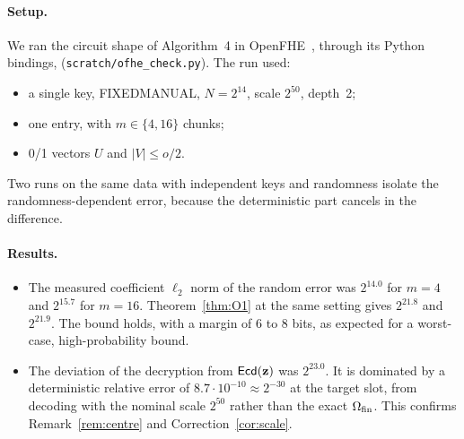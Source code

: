 \paragraph{Setup.} We ran the circuit shape of Algorithm~4 in OpenFHE~\cite{OpenFHE22}, through its Python bindings, (\texttt{scratch/ofhe\_check.py}). The run used:
\begin{itemize}[nosep]
  \item a single key, FIXEDMANUAL, $N=2^{14}$, scale $2^{50}$, depth~2;
  \item one entry, with $m\in\{4,16\}$ chunks;
  \item 0/1 vectors $U$ and $|V|\le o/2$.
\end{itemize}
Two runs on the same data with independent keys and randomness isolate the randomness-dependent error, because the deterministic part cancels in the difference.

\paragraph{Results.}
\begin{itemize}[nosep]
  \item The measured coefficient $\ell_2$ norm of the random error was $2^{14.0}$ for $m=4$ and $2^{15.7}$ for $m=16$. Theorem~\ref{thm:O1} at the same setting gives $2^{21.8}$ and $2^{21.9}$. The bound holds, with a margin of 6 to 8 bits, as expected for a worst-case, high-probability bound.
  \item The deviation of the decryption from $\mathsf{Ecd}(\mathbf z)$ was $2^{23.0}$. It is dominated by a deterministic relative error of $8.7\cdot10^{-10}\approx2^{-30}$ at the target slot, from decoding with the nominal scale $2^{50}$ rather than the exact $\Omega_{\mathrm{fin}}$. This confirms Remark~\ref{rem:centre} and Correction~\ref{cor:scale}.
\end{itemize}
